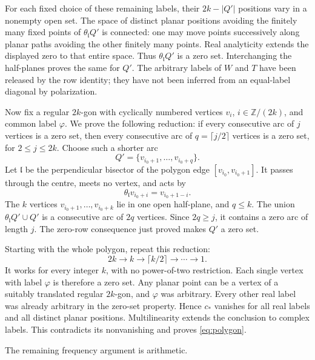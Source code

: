 \documentclass[11pt,letterpaper,reqno]{amsart}
\theoremstyle{definition}
\theoremstyle{remark}
\begin{document}
For each fixed choice of these remaining labels, their
$2k-|Q'|$ positions vary in a nonempty open set. The space of
distinct planar positions avoiding the finitely many fixed points
of $\theta_{\mathfrak l}Q'$ is connected: one may move points
successively along planar paths avoiding the other finitely many
points. Real analyticity extends the displayed zero to that entire
space. Thus $\theta_{\mathfrak l}Q'$ is a zero set. Interchanging
the half-planes proves the same for $Q'$. The arbitrary labels of
$W$ and $T$ have been released by the row identity; they have not
been inferred from an equal-label diagonal by polarization.

Now fix a regular $2k$-gon with cyclically numbered vertices
$v_i$, $i\in\mathbb Z/(2k)$, and common label $\varphi$.
We prove the following reduction: if every consecutive arc of
$j$ vertices is a zero set, then every consecutive arc of
$q=\lceil j/2\rceil$ vertices is a zero set, for $2\le j\le2k$.
Choose such a shorter arc
\[
 Q'=\{v_{i_0+1},\ldots,v_{i_0+q}\}.
\]
Let $\mathfrak l$ be the perpendicular bisector of the polygon edge
$[v_{i_0},v_{i_0+1}]$. It passes through the centre, meets no
vertex, and acts by
\[
 \theta_{\mathfrak l}v_{i_0+i}=v_{i_0+1-i}.
\]
The $k$ vertices $v_{i_0+1},\ldots,v_{i_0+k}$ lie in one open
half-plane, and $q\le k$. The union
$\theta_{\mathfrak l}Q'\cup Q'$ is a consecutive arc of $2q$
vertices. Since $2q\ge j$, it contains a zero arc of length $j$.
The zero-row consequence just proved makes $Q'$ a zero set.

Starting with the whole polygon, repeat this reduction:
\[
 2k\longrightarrow k\longrightarrow\lceil k/2\rceil
                       \longrightarrow\cdots\longrightarrow1.
\]
It works for every integer $k$, with no power-of-two restriction.
Each single vertex with label $\varphi$ is therefore a zero set.
Any planar point can be a vertex of a suitably translated regular
$2k$-gon, and $\varphi$ was arbitrary. Every other real label was
already arbitrary in the zero-set property. Hence $c_*$ vanishes
for all real labels and all distinct planar positions.
Multilinearity extends the conclusion to complex labels. This
contradicts its nonvanishing and proves \eqref{eq:polygon}.

The remaining frequency argument is arithmetic.
\end{document}
